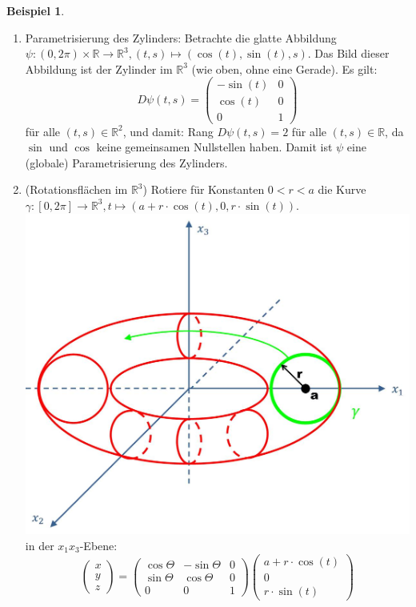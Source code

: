 \documentclass[a4paper,11pt,notitlepage]{report}
\theoremstyle{definition}
\newtheorem{example}{Beispiel}[chapter]
\newcommand{\R}{{\ensuremath{\mathbb{R}}}}
\begin{document}
\begin{example}
	\begin{enumerate}
		\item Parametrisierung des Zylinders:
			\newline
			Betrachte die glatte Abbildung $\psi \colon (0, 2 \pi) \times \R \rightarrow \R^3, (t,s) \mapsto (\cos{(t)}, \sin{(t)}, s)$. Das Bild dieser Abbildung ist der Zylinder im $\R^3$ (wie oben, ohne eine Gerade).
			Es gilt:
			$$D\psi(t,s) = \begin{pmatrix} -\sin{(t)} & 0 \\ \cos{(t)} & 0 \\ 0 & 1  \end{pmatrix} $$ für alle $(t,s) \in \R^2$, und damit:
			Rang $D \psi(t,s)=2$ für alle $(t,s) \in \R$, da $\sin$ und $\cos$ keine gemeinsamen Nullstellen haben.
			\newline
			Damit ist $\psi$ eine (globale) Parametrisierung des Zylinders.
			
		\item (Rotationsflächen im $\R^3$)
			\newline
			Rotiere für Konstanten $0 < r < a$ die Kurve $\gamma \colon [0,2\pi] \rightarrow \R^3, t \mapsto (a + r \cdot \cos{(t)}, 0, r \cdot \sin{(t)})$.
			\includegraphics[scale=0.4]{images/Torus_Rotation.jpg} in der $x_1 x_3$-Ebene:
			$$\begin{pmatrix}
				x \\ y \\z
			\end{pmatrix} = \begin{pmatrix}
			\cos{\Theta} & -\sin{\Theta} & 0 \\ \sin{\Theta} & \cos{\Theta} & 0 \\ 0 & 0 & 1
\end{pmatrix} \begin{pmatrix}
	a + r \cdot \cos{(t)} \\ 0 \\ r \cdot \sin{(t)}
\end{pmatrix}$$


\end{enumerate}
\end{example}
\end{document}
